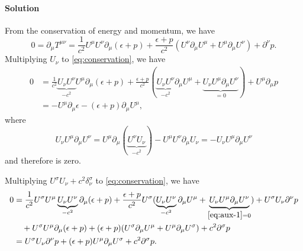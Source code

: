 \documentclass[hyperref, a4paper]{article}
\begin{document}
\paragraph{Solution} From the conservation of energy and momentum, we have 
\begin{equation}
    0 = \partial_\mu T^{\mu \nu} = \frac{1}{c^2} U^\mu U^\nu \partial_\mu(\epsilon + p) + \frac{\epsilon + p}{c^2} (U^\nu \partial_\mu U^\mu + U^\mu \partial_\mu U^\nu) + \partial^\nu p.
    \label{eq:conservation}
\end{equation}
Multiplying $U_\nu$ to \eqref{eq:conservation}, we have 
\begin{equation}
    \begin{aligned}
        0 &= \frac{1}{c^2} \underbrace{U_\nu U^\nu}_{- c^2} U^\mu \partial_\mu (\epsilon + p) 
        + \frac{\epsilon + p}{c^2} ( \underbrace{U_\nu U^\nu}_{-c^2} \partial_\mu U^\mu + \underbrace{U_\nu U^\mu \partial_\mu U^\nu}_{=0} ) + U^\mu \partial_\mu p \\
        &= - U^\mu \partial_\mu \epsilon - (\epsilon + p) \partial_\mu U^\mu ,
    \end{aligned}
\end{equation}
where 
\begin{equation}
    U_\nu U^\mu \partial_\mu U^\nu = U^\mu \partial_\mu ( \underbrace{U^\nu U_\nu}_{-c^2} ) - U^\mu U^\nu \partial_\mu U_\nu = - U_\nu U^\mu \partial_\mu U^\nu 
    \label{eq:aux-1}
\end{equation}
and therefore is zero. 

Multiplying $U^\sigma U_\nu + c^2 \delta^\sigma_\nu$ to \eqref{eq:conservation},
we have 
\begin{equation}
    \begin{aligned}
        0 &= \frac{1}{c^2} U^\sigma U^\mu \underbrace{U_\nu U^\nu}_{- c^2} \partial_\mu(\epsilon + p) + \frac{\epsilon + p}{c^2} U^\sigma ( \underbrace{U_\nu U^\nu}_{-c^2} \partial_\mu U^\mu + \underbrace{U_\nu U^\mu \partial_\mu U^\nu}_{\eqref{eq:aux-1} = 0}) + U^\sigma U_\nu \partial^\nu p  \\
        &\quad + U^\sigma U^\mu \partial_\mu (\epsilon + p) + (\epsilon + p) (U^\sigma \partial_\mu U^\mu + U^\mu \partial_\mu U^\sigma) + c^2 \partial^\sigma p \\
        &= U^\sigma U_\nu \partial^\nu p + (\epsilon + p) U^\mu \partial_\mu U^\sigma + c^2 \partial^\sigma p.
    \end{aligned}
\end{equation}
\end{document}

